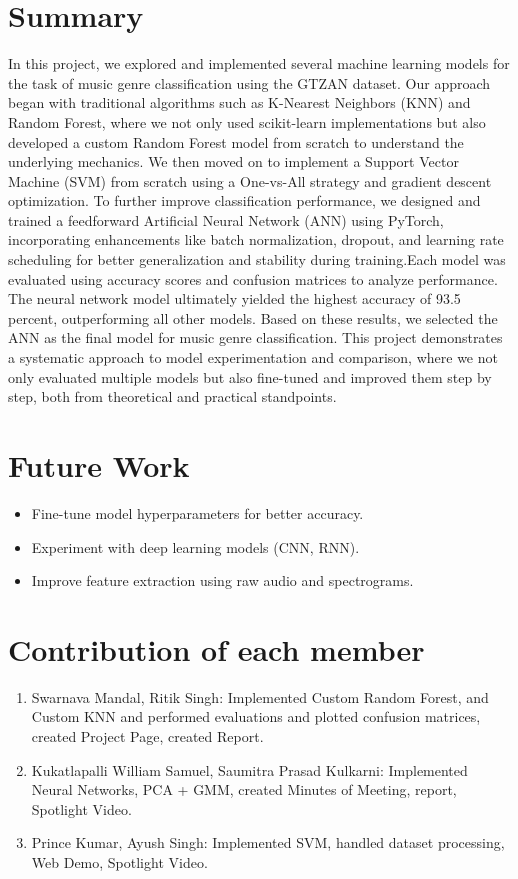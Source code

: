\documentclass[a4paper]{article}
\theoremstyle{plain}
\theoremstyle{definition}
\begin{document}
\section{Summary}
\label{sec:summary}
In this project, we explored and implemented several machine learning models for the task of music genre classification using the GTZAN dataset. Our approach began with traditional algorithms such as K-Nearest Neighbors (KNN) and Random Forest, where we not only used scikit-learn implementations but also developed a custom Random Forest model from scratch to understand the underlying mechanics. We then moved on to implement a Support Vector Machine (SVM) from scratch using a One-vs-All strategy and gradient descent optimization. To further improve classification performance, we designed and trained a feedforward Artificial Neural Network (ANN) using PyTorch, incorporating enhancements like batch normalization, dropout, and learning rate scheduling for better generalization and stability during training.Each model was evaluated using accuracy scores and confusion matrices to analyze performance. The neural network model ultimately yielded the highest accuracy of 93.5 percent, outperforming all other models. Based on these results, we selected the ANN as the final model for music genre classification.
This project demonstrates a systematic approach to model experimentation and comparison, where we not only evaluated multiple models but also fine-tuned and improved them step by step, both from theoretical and practical standpoints.

\section{Future Work}
\begin{itemize}
    \item Fine-tune model hyperparameters for better accuracy.
    \item Experiment with deep learning models (CNN, RNN).
    \item Improve feature extraction using raw audio and spectrograms.
\end{itemize}




\appendix

\section{Contribution of each member}
\label{sec:contribution}
\begin{enumerate}
    \item Swarnava Mandal, Ritik Singh: Implemented Custom Random Forest, and Custom KNN and performed evaluations and plotted confusion matrices, created Project Page, created Report.
    \item Kukatlapalli William Samuel, Saumitra Prasad Kulkarni: Implemented Neural Networks, PCA + GMM, created Minutes of Meeting, report, Spotlight Video.
    \item Prince Kumar, Ayush Singh: Implemented SVM, handled dataset processing, Web Demo, Spotlight Video.
\end{enumerate}
\end{document}
